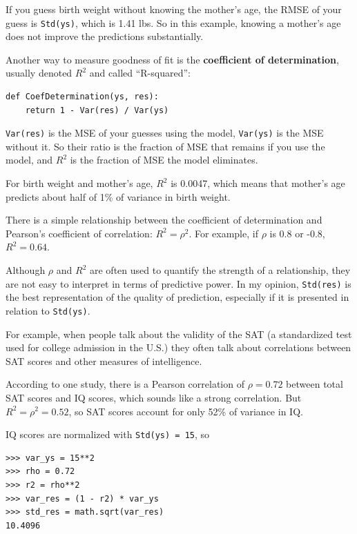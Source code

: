 \documentclass[12pt]{book}
\begin{document}
If you guess birth weight without knowing the mother's age, the RMSE
of your guess is {\tt Std(ys)}, which is 1.41 lbs.  So in this
example, knowing a mother's age does not improve the predictions
substantially.

Another way to measure goodness of fit is  the {\bf
  coefficient of determination}, usually denoted $R^2$ and 
called ``R-squared'':

\begin{verbatim}
def CoefDetermination(ys, res):
    return 1 - Var(res) / Var(ys)
\end{verbatim}

{\tt Var(res)} is the MSE of your guesses using the model,
{\tt Var(ys)} is the MSE without it.   So their ratio is the fraction
of MSE that remains if you use the model, and $R^2$ is the fraction
of MSE the model eliminates.

For birth weight and mother's age, $R^2$ is 0.0047, which means
that mother's age predicts about half of 1\% of variance in
birth weight.

There is a simple relationship between the coefficient of
determination and Pearson's coefficient of correlation: $R^2 = \rho^2$.
For example, if $\rho$ is 0.8 or -0.8, $R^2 = 0.64$.

Although $\rho$ and $R^2$ are often used to quantify the strength of a
relationship, they are not easy to interpret in terms of predictive
power.  In my opinion, {\tt Std(res)} is the best representation
of the quality of prediction, especially if it is presented
in relation to {\tt Std(ys)}.

For example, when people talk about the validity of the SAT
(a standardized test used for college admission in the U.S.) they
often talk about correlations between SAT scores and other measures of
intelligence.

According to one study, there is a Pearson correlation of
$\rho=0.72$ between total SAT scores and IQ scores, which sounds like
a strong correlation.  But $R^2 = \rho^2 = 0.52$, so SAT scores
account for only 52\% of variance in IQ.

IQ scores are normalized with {\tt Std(ys) = 15}, so

\begin{verbatim}
>>> var_ys = 15**2
>>> rho = 0.72
>>> r2 = rho**2
>>> var_res = (1 - r2) * var_ys
>>> std_res = math.sqrt(var_res)
10.4096
\end{verbatim}
\end{document}
